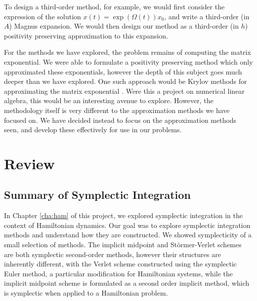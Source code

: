 To design a third-order method, for example, we would first consider the expression of the solution $x(t) = \exp(\Omega(t))x_0$,
and write a third-order (in $A$) Magnus expansion. 
We would then design our method as a third-order (in $h$) positivity preserving approximation to this expansion. 

For the methods we have explored, the problem remains of computing the matrix exponential.
We were able to formulate a positivity preserving method which only approximated these exponentials,
however the depth of this subject goes much deeper than we have explored.
One such approach would be Krylov methods for approximating the matrix exponential \cite{meerbergen1999crying}.
Were this a project on numerical linear algebra, this would be an interesting avenue to explore.
However, the methodology itself is very different to the approximation methods we have focused on.
We have decided instead to focus on the approximation methods seen, and develop these effectively for use in our problems.


\section{Review}


\subsection{Summary of Symplectic Integration}
In Chapter \ref{cha:ham} of this project, we explored symplectic integration in the context of Hamiltonian dynamics.
Our goal was to explore symplectic integration methods and understand how they are constructed.
We showed symplecticity of a small selection of methods.
The implicit midpoint and St\"ormer-Verlet schemes are both symplectic second-order methods,
however their structures are inherently different,
with the Verlet scheme constructed using the symplectic Euler method, a particular modification for Hamiltonian systems,
while the implicit midpoint scheme is formulated as a second order implicit method, which is symplectic when applied to a Hamiltonian problem.

